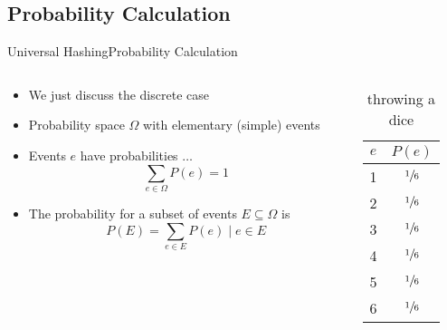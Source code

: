 \subsection{Probability Calculation}
\def\E{\mathbb{E}}
\begin{frame}{Universal Hashing}{Probability Calculation}
  \begin{columns}
    \begin{column}{0.65\textwidth}
      \begin{itemize}
        \item<2->
          We just discuss the discrete case
        \item<3->
          Probability space {\color{MainA}$\Omega$} with {\color{MainA}elementary (simple) events}
        \item<4->
          Events {\color{MainA}$e$} have probabilities $\ldots$\\
          {\color{MainA}\[\sum_{e \in \Omega} P(e) = 1\]}
        \item<5->
          The probability for a subset of events
          {\color{MainA}$E \subseteq \Omega$} is
          {\color{MainA}\[P(E) = \sum_{e \in E} P(e) \mid e \in E\]}
      \end{itemize}
    \end{column}
    \begin{column}{0.35\textwidth}
      \begin{table}[!h]
        \caption{throwing a dice}
        \label{tab:probabilities:rolling_dice}
        \begin{tabularx}{0.5\linewidth}{c|c}
          {\color{MainA}$e$} & {\color{MainA}$P(e)$}\\
          \midrule
          1 & $\sfrac{1}{6}$\\
          2 & $\sfrac{1}{6}$\\
          3 & $\sfrac{1}{6}$\\
          4 & $\sfrac{1}{6}$\\
          5 & $\sfrac{1}{6}$\\
          6 & $\sfrac{1}{6}$\\
        \end{tabularx}
      \end{table}
    \end{column}
  \end{columns}
\end{frame}


